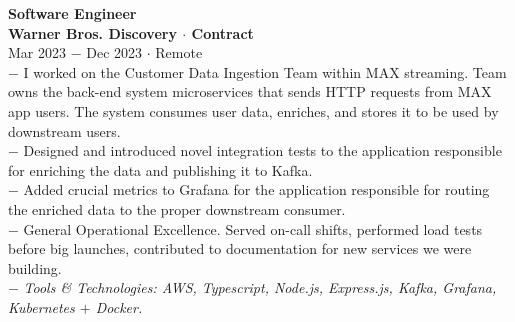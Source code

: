 \documentclass{resume}
\begin{document}
\begin{flushleft}
\normalsize{\bf Software Engineer}\\
\footnotesize{\bf Warner Bros. Discovery $\cdot$ Contract}\\
\footnotesize{Mar 2023 $-$ Dec 2023 $\cdot$ Remote}\\[1mm]
{\scriptsize
	$-$ I worked on the Customer Data Ingestion Team within MAX streaming. Team owns the back-end system microservices that sends HTTP requests from MAX app users. The system consumes user data, enriches, and stores it to be used by downstream users.\\
	$-$ Designed and introduced novel integration tests to the application responsible for enriching the data and publishing it to Kafka.\\
	$-$ Added crucial metrics to Grafana for the application responsible for routing the enriched data to the proper downstream consumer.\\
	$-$ General Operational Excellence. Served on-call shifts, performed load tests before big launches, contributed to documentation for new services we were building.\\
	$-$ \textit{Tools \& Technologies: AWS, Typescript, Node.js, Express.js, Kafka, Grafana, Kubernetes $+$ Docker.}
}\\[3mm]


\end{flushleft}
\end{document}
